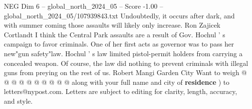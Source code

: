 \begin{textsample}{NEG Dim 6 – global\_north\_2024\_05 – Score -1.00 – global\_north\_2024\_05/107939843.txt}
Undoubtedly, it occurs after dark, and with summer coming those assaults will likely only increase.
Ron Zajicek Cortlandt I think the Central Park assaults are a result of Gov.
Hochul ' s campaign to favor criminals.
One of her first acts as governor was to pass her new"gun safety"law.
Hochul ' s law limited pistol-permit holders from carrying a concealed weapon.
Of course, the law did nothing to prevent criminals with illegal guns from preying on the rest of us.
Robert Mangi Garden City Want to weigh @ @ @ @ @ @ @ @ @ @ along with your full name and city of \textbf{residence} ) to letters@nypost.com.
Letters are subject to editing for clarity, length, accuracy, and style.

\end{textsample}
